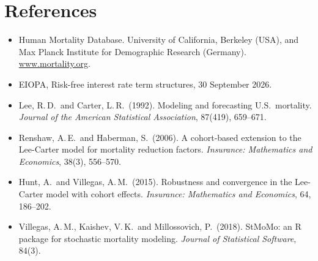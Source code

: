 \documentclass[11pt,a4paper]{article}
\begin{document}
\section*{References}
\begin{itemize}
  \item Human Mortality Database. University of California, Berkeley (USA), and Max Planck
        Institute for Demographic Research (Germany). \url{www.mortality.org}.
  \item EIOPA, Risk-free interest rate term structures, 30 September 2026.
  \item Lee, R.\,D.\ and Carter, L.\,R.\ (1992). Modeling and forecasting U.S.\ mortality.
        \emph{Journal of the American Statistical Association}, 87(419), 659--671.
  \item Renshaw, A.\,E.\ and Haberman, S.\ (2006). A cohort-based extension to the Lee-Carter
        model for mortality reduction factors. \emph{Insurance: Mathematics and Economics},
        38(3), 556--570.
  \item Hunt, A.\ and Villegas, A.\,M.\ (2015). Robustness and convergence in the
        Lee-Carter model with cohort effects. \emph{Insurance: Mathematics and Economics},
        64, 186--202.
  \item Villegas, A.\,M., Kaishev, V.\,K.\ and Millossovich, P.\ (2018). StMoMo: an R package
        for stochastic mortality modeling. \emph{Journal of Statistical Software}, 84(3).
\end{itemize}
\end{document}
